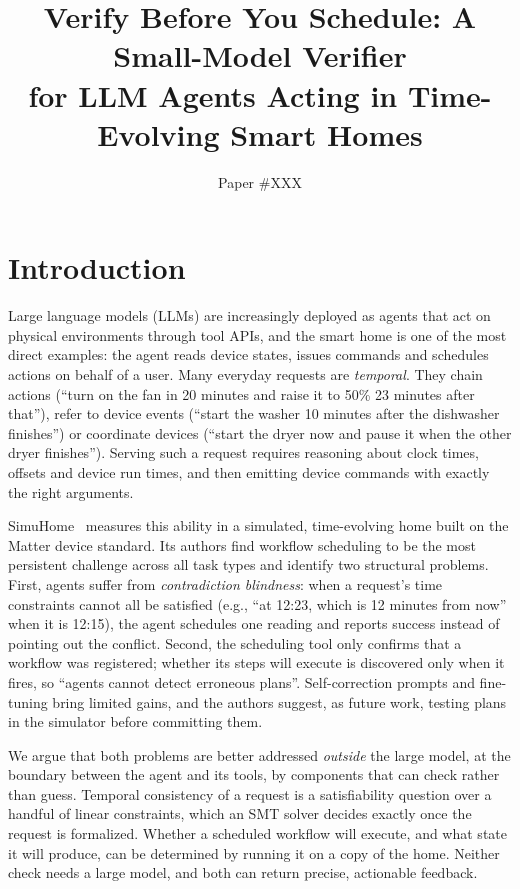 \documentclass[sigconf]{aamas}
\title[Verify Before You Schedule]{Verify Before You Schedule: A Small-Model Verifier\\for LLM Agents Acting in Time-Evolving Smart Homes}
\author{Paper \#XXX}
\affiliation{}
\begin{document}
\pagestyle{fancy}
\fancyhead{}
\maketitle

\section{Introduction}

Large language models (LLMs) are increasingly deployed as agents that act on physical environments through tool
APIs, and the smart home is one of the most direct examples: the agent reads device states, issues commands and
schedules actions on behalf of a user. Many everyday requests are \emph{temporal}. They chain actions
(``turn on the fan in 20 minutes and raise it to 50\% 23 minutes after that''), refer to device events
(``start the washer 10 minutes after the dishwasher finishes'') or coordinate devices (``start the dryer now and
pause it when the other dryer finishes''). Serving such a request requires reasoning about clock times,
offsets and device run times, and then emitting device commands with exactly the right arguments.

SimuHome~\cite{seo2026simuhome} measures this ability in a simulated, time-evolving home built on the Matter
device standard. Its authors find workflow scheduling to be the most persistent challenge across all task types
and identify two structural problems. First, agents suffer from \emph{contradiction blindness}: when a request's
time constraints cannot all be satisfied (e.g., ``at 12:23, which is 12 minutes from now'' when it is 12:15),
the agent schedules one reading and reports success instead of pointing out the conflict. Second, the scheduling
tool only confirms that a workflow was registered; whether its steps will execute is discovered only when it
fires, so ``agents cannot detect erroneous plans''. Self-correction prompts and fine-tuning bring limited gains,
and the authors suggest, as future work, testing plans in the simulator before committing them.

We argue that both problems are better addressed \emph{outside} the large model, at the boundary between the
agent and its tools, by components that can check rather than guess. Temporal consistency of a request is a
satisfiability question over a handful of linear constraints, which an SMT solver decides exactly once the
request is formalized. Whether a scheduled workflow will execute, and what state it will produce, can be
determined by running it on a copy of the home. Neither check needs a large model, and both can return precise,
actionable feedback.
\end{document}
